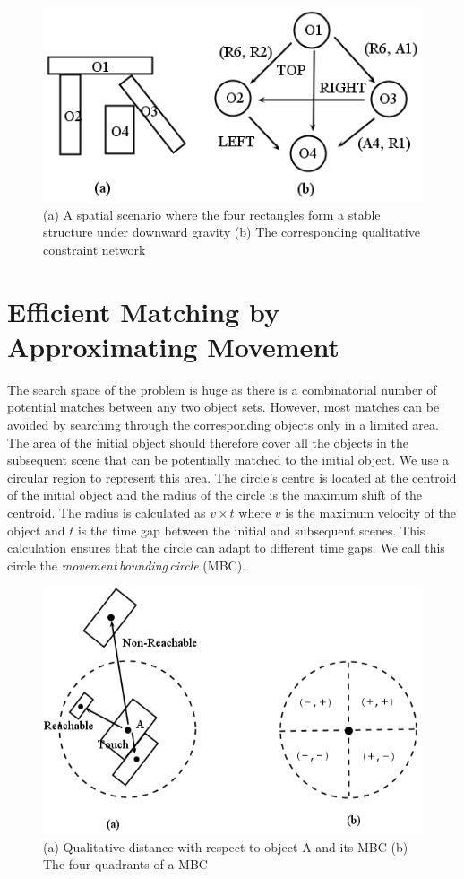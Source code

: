 \documentclass[letterpaper]{article}
\begin{document}
 \begin{figure}[h!]
\centering\includegraphics[scale=0.35]{QCN.png}\caption{(a) A spatial scenario where the four rectangles form a stable structure under downward gravity (b) The corresponding qualitative constraint network}
\label{QCN}
\end{figure}

\section{Efficient Matching by Approximating Movement}\label{approxM}

The search space of the problem is huge as there is a combinatorial number of potential matches between any two object sets. However, most matches can be avoided by searching through the corresponding objects only in a limited area. The area of the initial object should therefore cover all the objects in the subsequent scene that can be potentially matched to the initial object.  We use a circular region to represent this area. The circle's centre is located at the centroid of the initial object and the radius of the circle is the maximum shift of the centroid. The radius is calculated as $v \times t$ where $v$ is the maximum velocity of the object and $t$ is the time gap between the initial and subsequent scenes. This calculation ensures that the circle can adapt to different time gaps. We call this circle the \emph{movement\,bounding\,circle} (MBC).  
\begin{figure}[h!]
\centering\includegraphics[scale=0.3]{quadrants.png}\caption{(a) Qualitative distance with respect to object A and its MBC (b)  The four quadrants of a MBC }
\label{Quadrants}
\vspace{-4mm}
\end{figure}
\end{document}
